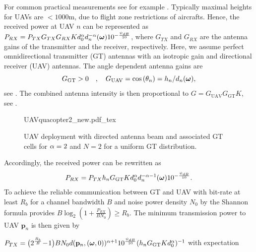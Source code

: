 \documentclass[12pt,onecolumn,journal,draftclsnofoot,letterpaper]{IEEEtran}
\newif\ifarxiv\arxivfalse
\newcounter{example}[section]
\renewcommand{\vq}{\mathbf p}
\newcommand{\Rb}{\ensuremath{R_b}}         %
\newcommand{\GGT}{\ensuremath{G_{\text{GT}}}}         %
\newcommand{\GUAV}{\ensuremath{G_{\text{UAV}}}}         %
\begin{document}
%
For common practical measurements see for example \cite{AG18}.  Typically
maximal heights for UAVs are $<1000$m, due to flight zone restrictions of aircrafts.  Hence, the received power at
UAV $n$ can be represented as
%
$P_{RX}=P_{TX}G_{TX}G_{RX}Kd^{\alpha}_0 d_n^{-\alpha}(\boldsymbol{ \omega})10^{-\frac{\psi_{dB}}{10}}$,
%
where $G_{TX}$ and $G_{RX}$ are the antenna gains of the transmitter and the receiver, respectively. Here, we assume
perfect omnidirectional transmitter (GT) antennas with an isotropic gain and directional receiver (UAV) antennas.  The
angle dependent antenna gains are %
%
\begin{equation}
\GGT >0\quad,\quad
  \GUAV = \cos\left(\theta_n\right)=h_n/d_n(\vome),
\label{eq:Gdirected}
\end{equation}
%
see \cite[p.52]{Bal05a}. The combined antenna intensity is then proportional to
%
$G=\GUAV \GGT K$, see .
%
\begin{figure}
  \centering
  \def\svgwidth{.85\textwidth} \scriptsize{
    {UAVquacopter2_new.pdf_tex}}
    \caption{UAV deployment with directed antenna beam and associated GT cells for $\alpha=2$ and $N=2$ for a uniform GT distribution.}
    \label{fig:uavdirected}
\end{figure}
%
Accordingly, the received power can be rewritten as
%
\begin{equation}
  P_{RX}=P_{TX}h_n \GGT K d^{\alpha}_0 d_n^{-\alpha-1}(\vome)10^{-\frac{\psi_{dB}}{10}}.
\end{equation}
%
To achieve the reliable communication between GT and UAV with bit-rate at least $\Rb$ for a
channel bandwidth $B$  and noise power density $N_0$ by the Shannon formula provides 
$B\log_2\left(1+\frac{P_{RX}}{BN_0}\right)\ge\Rb$.
The minimum transmission power to UAV $\vq_n$ is then given by%
\ifarxiv
\begin{align}
P_{TX}=\big(2^{\frac{\Rb}{B}}\!-\!1\big)B N_0d(\vq_n,(\vome,0))^{\alpha+1}10^{\frac{\psi_{dB}}{10}} (h_n \GGT
Kd^{\alpha}_0)^{-1}
\end{align}
\else
$P_{TX}=\big(2^{\frac{\Rb}{B}}\!-\!1\big)B N_0d(\vq_n,(\vome,0))^{\alpha+1}10^{\frac{\psi_{dB}}{10}} (h_n \GGT
Kd^{\alpha}_0)^{-1}$
\fi%
with expectation
%
%
\end{document}

